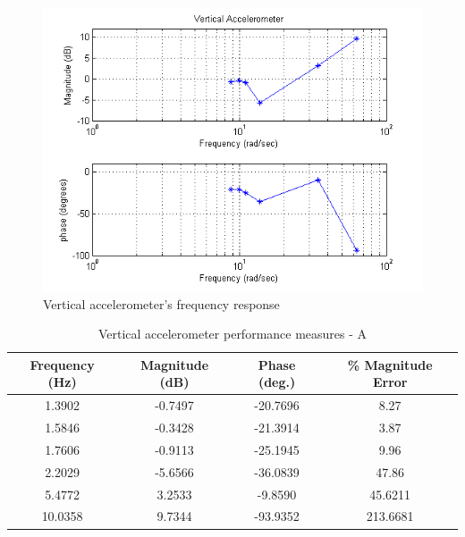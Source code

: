 \documentclass{article}
\theoremstyle{plain}
\theoremstyle{definition}
\theoremstyle{remark}
\begin{document}
\begin{figure}[hbt]
\begin{center}
\includegraphics[width = 14cm]{VerticalBode.png}
\caption{Vertical accelerometer's frequency response}
\label{verticalBode}
\end{center}
\end{figure}


\begin{table}
\begin{center}
    \begin{tabular}{|c|c|c|c|}
        \hline
        Frequency (Hz)  & Magnitude (dB) & Phase (deg.) & \% Magnitude Error \\ \hline
	1.3902  & -0.7497  & -20.7696 & 8.27\\
       1.5846  & -0.3428  & -21.3914 & 3.87 \\
	1.7606  & -0.9113 & -25.1945 & 9.96  \\
	2.2029 & -5.6566  & -36.0839 & 47.86   \\
	5.4772 & 3.2533  & -9.8590 & 45.6211  \\
	10.0358 & 9.7344 & -93.9352 & 213.6681 \\
        \hline
    \end{tabular}
\caption{Vertical accelerometer performance measures - A}  
\label{vertical_tableA}
\end{center}
\end{table}
\end{document}
